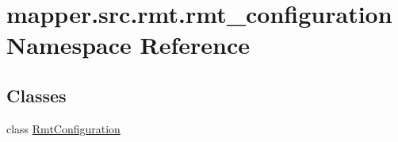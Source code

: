\hypertarget{namespacemapper_1_1src_1_1rmt_1_1rmt__configuration}{}\section{mapper.\+src.\+rmt.\+rmt\+\_\+configuration Namespace Reference}
\label{namespacemapper_1_1src_1_1rmt_1_1rmt__configuration}
\subsection*{Classes}
\begin{DoxyCompactItemize}
\item 
class \hyperlink{classmapper_1_1src_1_1rmt_1_1rmt__configuration_1_1_rmt_configuration}{Rmt\+Configuration}
\end{DoxyCompactItemize}
